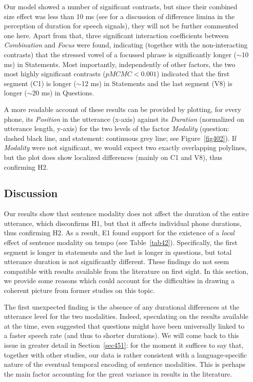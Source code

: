 Our model showed a number of significant contrasts, but since their combined size effect was less than 10 ms (see \citealt{lehiste1970suprasegmentals} for a discussion of difference limina in the perception of duration for speech signals), they will not be further commented one here. Apart from that, three significant interaction coefficients between \textit{Combination} and \textit{Focus} were found, indicating (together with the non-interacting contrasts) that the stressed vowel of a focussed phrase is significantly longer ($ \sim $10 ms) in Statements. Most importantly, independently of other factors, the two most highly significant contrasts ($pMCMC<0.001$) indicated that the first segment (C1) is longer ($ \sim $12 ms) in Statements and the last segment (V8) is longer ($ \sim $20 ms) in Questions.

A more readable account of these results can be provided by plotting, for every phone, its \textit{Position} in the utterance (x-axis) against its \textit{Duration} (normalized on utterance length, y-axis) for the two levels of the factor \textit{Modality} (question: dashed black line, and statement: continuous grey line; see Figure~\ref{fig402}). If \textit{Modality} were not significant, we would expect two exactly overlapping polylines, but the plot does show localized differences (mainly on C1 and V8), thus confirming H2.

\subsection{Discussion}\label{sec434}
Our results show that sentence modality does not affect the duration of the entire utterance, which disconfirms H1, but that it affects individual phone durations, thus confirming H2. As a result, E1 found support for the existence of a \textit{local} effect of sentence modality on tempo (see Table~\ref{tab42}). Specifically, the first segment is longer in statements and the last is longer in questions, but total utterance duration is not significantly different. These findings do not seem compatible with results available from the literature on first sight. In this section, we provide some reasons which could account for the difficulties in drawing a coherent picture from former studies on this topic. 

The first unexpected finding is the absence of any durational differences at the utterance level for the two modalities. Indeed, speculating on the results available at the time, \citet{vanheuven2005speech} even suggested that questions might have been universally linked to a faster speech rate (and thus to shorter durations). We will come back to this issue in greater detail in Section~\ref{sec451}: for the moment it suffices to say that, together with other studies, our data is rather consistent with a language-specific nature of the eventual temporal encoding of sentence modalities. This is perhaps the main factor accounting for the great variance in results in the literature.

